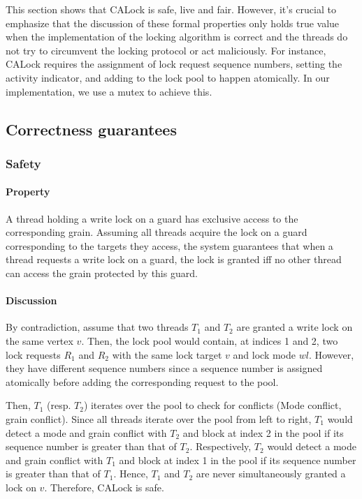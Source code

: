 This section shows that CALock is safe, live and fair. 
However, it's crucial to emphasize that the discussion of these formal properties only holds true value when the implementation of the locking algorithm is correct and the threads do not try to circumvent the locking protocol or act maliciously. 
For instance, CALock requires the assignment of lock request sequence numbers, setting the activity indicator, and adding to the lock pool to happen atomically. In our implementation, we use a mutex to achieve this. 

\subsection{Correctness guarantees}

\subsubsection[Safety]{Safety}


\paragraph{Property} A thread holding a write lock on a guard has exclusive access to the corresponding grain. Assuming all threads acquire the lock on a guard corresponding to the targets they access, the system guarantees that when a thread requests a write lock on a guard, the lock is granted iff no other thread can access the grain protected by this guard.

\paragraph{Discussion} By contradiction, assume that two threads $T_1$ and $T_2$ are granted a write lock on the same vertex $v$. 
Then, the lock pool would contain, at indices 1 and 2, two lock requests $R_1$ and $R_2$ with the same lock target $v$ and lock mode $wl$. However, they have different sequence numbers since a sequence number is assigned atomically before adding the corresponding request to the pool.

Then, $T_1$ (resp. $T_2$) iterates over the pool to check for conflicts (Mode conflict, grain conflict). 
Since all threads iterate over the pool from left to right, $T_1$ would detect a mode and grain conflict with $T_2$ and block at index 2 in the pool if its sequence number is greater than that of $T_2$. Respectively, $T_2$ would detect a mode and grain conflict with $T_1$ and block at index 1 in the pool if its sequence number is greater than that of $T_1$.
Hence, $T_1$ and $T_2$ are never simultaneously granted a lock on $v$. Therefore, CALock is safe.

